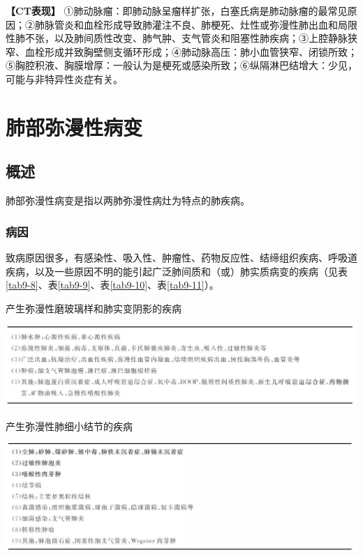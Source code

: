 \textbf{【CT表现】}
①肺动脉瘤：即肺动脉呈瘤样扩张，白塞氏病是肺动脉瘤的最常见原因；②肺脉管炎和血栓形成导致肺灌注不良、肺梗死、灶性或弥漫性肺出血和局限性肺不张，以及肺间质性改变、肺气肿、支气管炎和阻塞性肺疾病；③上腔静脉狭窄、血栓形成并致胸壁侧支循环形成；④肺动脉高压：肺小血管狭窄、闭锁所致；⑤胸腔积液、胸膜增厚：一般认为是梗死或感染所致；⑥纵隔淋巴结增大：少见，可能与非特异性炎症有关。

\section{肺部弥漫性病变}

\subsection{概述}

肺部弥漫性病变是指以两肺弥漫性病灶为特点的肺疾病。

\subsubsection{病因}

致病原因很多，有感染性、吸入性、肿瘤性、药物反应性、结缔组织疾病、呼吸道疾病，以及一些原因不明的能引起广泛肺间质和（或）肺实质病变的疾病（见表\ref{tab9-8}、表\ref{tab9-9}、表\ref{tab9-10}、表\ref{tab9-11}）。

\begin{table}[htbp]
\centering
\caption{产生弥漫性磨玻璃样和肺实变阴影的疾病}
\label{tab9-8}
\includegraphics[width=\textwidth,height=\textheight,keepaspectratio]{./images/Image00231.jpg}
\end{table}

\begin{table}[htbp]
\centering
\caption{产生弥漫性肺细小结节的疾病}
\label{tab9-9}
\includegraphics[width=\textwidth,height=\textheight,keepaspectratio]{./images/Image00232.jpg}
\end{table}


